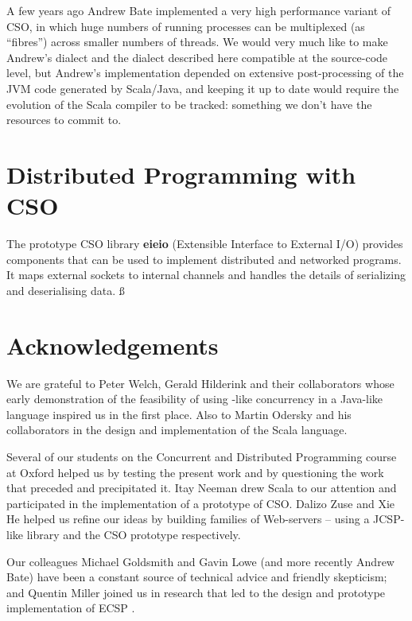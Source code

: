 \documentclass[12pt]{IOS-Book-Article-CPA-2017}
\begin{document}
A few years ago Andrew Bate implemented a very high performance
variant of CSO, in which huge numbers of running processes can be
multiplexed (as ``fibres'') across smaller numbers of threads. We
would very much like to make Andrew's dialect and the dialect
described here compatible at the source-code level, but Andrew's
implementation depended on extensive post-processing of the JVM
code generated by Scala/Java, and keeping it up to date would require
the evolution of the Scala compiler to be tracked: something we 
don't have the resources to commit to.

\section{Distributed Programming with CSO}
The prototype  CSO library \textbf{eieio} (Extensible Interface to External I/O)
provides components that can be used to implement distributed and 
networked programs. It maps external sockets to internal channels and handles 
the details of serializing and deserialising data. ß




\section*{Acknowledgements}
We are grateful to Peter Welch, Gerald Hilderink and their
collaborators whose early demonstration of the feasibility of using
\occam-like concurrency in a Java-like language inspired us in the first place.
Also to Martin Odersky and his collaborators in the design and
implementation of the Scala language.

Several of our students on the Concurrent and Distributed Programming course at Oxford
helped us by testing the present work and by questioning the work that 
preceded and precipitated it.
Itay Neeman drew Scala to our attention and participated
in the implementation of a prototype of CSO. Dalizo Zuse and Xie He
helped us refine our ideas by building families of Web-servers -- using
a JCSP-like library and the CSO prototype respectively.

Our colleagues Michael Goldsmith and Gavin Lowe (and more recently Andrew Bate)
have been a constant source of technical advice
and friendly skepticism; and
Quentin Miller joined us in research that led to the
design and prototype implementation of ECSP \cite{ecsp,ecspman}.
\end{document}
